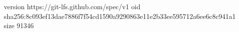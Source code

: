 version https://git-lfs.github.com/spec/v1
oid sha256:8c093ef13dae7886f7f54cd1590a9290863e11e2b33ee595712a6ee6c8c941a1
size 91346
